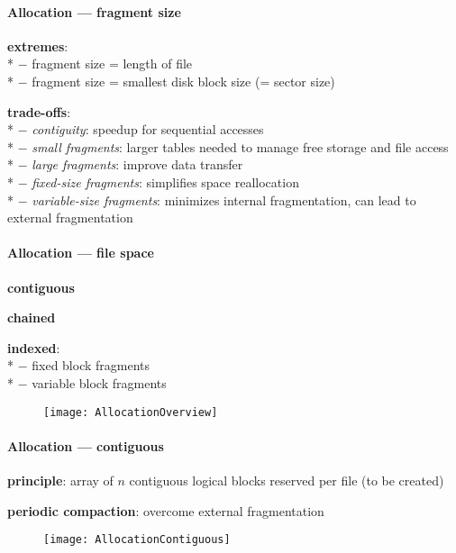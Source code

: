 \paragraph{Allocation --- fragment size}
\begin{items}
  \item \textbf{extremes}: \\*
    $ - $ fragment size = length of file \\*
    $ - $ fragment size = smallest disk block size (= sector size)
  \item \textbf{trade-offs}: \\*
    $ - $ \emph{contiguity}: speedup for sequential accesses \\*
    $ - $ \emph{small fragments}: larger tables needed to manage free storage and file access \\*
    $ - $ \emph{large fragments}: improve data transfer \\*
    $ - $ \emph{fixed-size fragments}: simplifies space reallocation \\*
    $ - $ \emph{variable-size fragments}: minimizes internal fragmentation, can lead to external fragmentation
\end{items}

\paragraph{Allocation --- file space}
\begin{items}
  \item \textbf{contiguous}
  \item \textbf{chained}
  \item \textbf{indexed}: \\*
    $ - $ fixed block fragments \\*
    $ - $ variable block fragments
\end{items}
\begin{figure}[H]\centering\label{AllocationOverview}\texttt{[image: AllocationOverview]}\end{figure}

\paragraph{Allocation --- contiguous}
\begin{items}
  \item \textbf{principle}: array of $ n $ contiguous logical blocks reserved per file (to be created)
  \item \textbf{periodic compaction}: overcome external fragmentation
\end{items}
\begin{figure}[H]\centering\label{AllocationContiguous}\texttt{[image: AllocationContiguous]}\end{figure}

